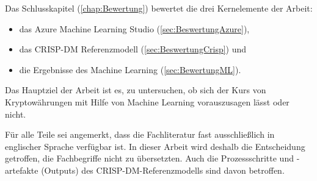 Das Schlusskapitel (\ref{chap:Bewertung}) bewertet die drei Kernelemente der Arbeit:
\begin{itemize}
\item das Azure Machine Learning Studio (\ref{sec:BeswertungAzure}),
\item das CRISP-DM Referenzmodell (\ref{sec:BeswertungCrisp}) und
\item die Ergebnisse des Machine Learning (\ref{sec:BewertungML}).
\end{itemize}
Das Hauptziel der Arbeit ist es, zu untersuchen, ob sich der Kurs von Kryptowährungen mit Hilfe von Machine Learning vorauszusagen lässt oder nicht.\par
Für alle Teile sei angemerkt, dass die Fachliteratur fast ausschließlich in englischer Sprache verfügbar ist. In dieser Arbeit wird deshalb die Entscheidung getroffen, die Fachbegriffe nicht zu übersetzten. Auch die Prozessschritte und -artefakte (Outputs) des CRISP-DM-Referenzmodells sind davon betroffen. 
